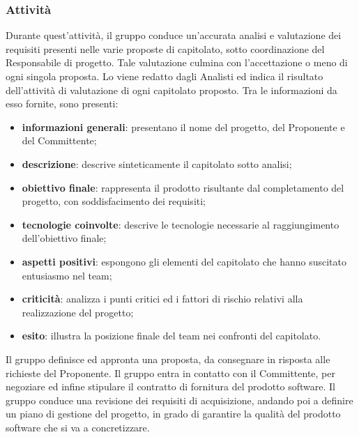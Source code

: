     \subsubsection{Attività}
    Durante quest'attività, il gruppo conduce un'accurata analisi e valutazione dei requisiti presenti nelle varie proposte di capitolato, sotto coordinazione del Responsabile di progetto. Tale valutazione culmina con l'accettazione o meno di ogni singola proposta.
    Lo \SdF{} viene redatto dagli Analisti ed indica il risultato dell'attività di valutazione di ogni capitolato proposto. Tra le informazioni da esso fornite, sono presenti:
    \begin{itemize}
        \item{\textbf{informazioni generali}: presentano il nome del progetto, del Proponente e del Committente;}
        \item{\textbf{descrizione}: descrive sinteticamente il capitolato sotto analisi;}
        \item{\textbf{obiettivo finale}: rappresenta il prodotto risultante dal completamento del progetto, con soddisfacimento dei requisiti;}
        \item{\textbf{tecnologie coinvolte}: descrive le tecnologie necessarie al raggiungimento dell'obiettivo finale;}
        \item{\textbf{aspetti positivi}: espongono gli elementi del capitolato che hanno suscitato entusiasmo nel team;}
        \item{\textbf{criticità}: analizza i punti critici ed i fattori di rischio relativi alla realizzazione del progetto;}
        \item{\textbf{esito}: illustra la posizione finale del team nei confronti del capitolato.}
    \end{itemize}
    Il gruppo definisce ed appronta una proposta, da consegnare in risposta alle richieste del Proponente.
    Il gruppo entra in contatto con il Committente, per negoziare ed infine stipulare il contratto di fornitura del prodotto software.
    Il gruppo conduce una revisione dei requisiti di acquisizione, andando poi a definire un piano di gestione del progetto, in grado di garantire la qualità del prodotto software che si va a concretizzare.
